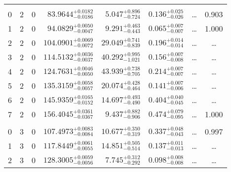 \begin{table*}[!]
\begin{tabular}{llcrrlrc}
\hline \\[-8pt]
0 & 2 & 0 & $     83.9644_{-      0.0186}^{+      0.0182}$ & $       5.047_{-       0.724}^{+       0.896}$ & $       0.136_{-       0.026}^{+       0.025}$ & \multicolumn{1}{c}{\dots} & 0.903\\[1pt]
1 & 2 & 0 & $     94.0829_{-      0.0047}^{+      0.0050}$ & $       9.291_{-       0.443}^{+       0.463}$ & $       0.065_{-       0.007}^{+       0.007}$ & \multicolumn{1}{c}{\dots} & 1.000\\[1pt]
2 & 2 & 0 & $    104.0901_{-      0.0072}^{+      0.0069}$ & $      29.049_{-       0.839}^{+       0.741}$ & $       0.196_{-       0.014}^{+       0.014}$ & \multicolumn{1}{c}{\dots} & \dots \\[1pt]
3 & 2 & 0 & $    114.5132_{-      0.0037}^{+      0.0036}$ & $      40.292_{-       1.021}^{+       0.995}$ & $       0.156_{-       0.008}^{+       0.007}$ & \multicolumn{1}{c}{\dots} & \dots \\[1pt]
4 & 2 & 0 & $    124.7631_{-      0.0050}^{+      0.0046}$ & $      43.939_{-       0.705}^{+       0.738}$ & $       0.214_{-       0.007}^{+       0.007}$ & \multicolumn{1}{c}{\dots} & \dots \\[1pt]
5 & 2 & 0 & $    135.3159_{-      0.0057}^{+      0.0058}$ & $      20.074_{-       0.464}^{+       0.428}$ & $       0.141_{-       0.006}^{+       0.007}$ & \multicolumn{1}{c}{\dots} & \dots \\[1pt]
6 & 2 & 0 & $    145.9359_{-      0.0152}^{+      0.0165}$ & $      14.697_{-       0.490}^{+       0.493}$ & $       0.404_{-       0.045}^{+       0.040}$ & \multicolumn{1}{c}{\dots} & \dots \\[1pt]
7 & 2 & 0 & $    156.4045_{-      0.0367}^{+      0.0361}$ & $       9.437_{-       0.906}^{+       0.882}$ & $       0.474_{-       0.095}^{+       0.079}$ & \multicolumn{1}{c}{\dots} & 1.000\\[1pt]

\hline \\[-8pt]
0 & 3 & 0 & $    107.4973_{-      0.0084}^{+      0.0083}$ & $      10.677_{-       0.319}^{+       0.350}$ & $       0.337_{-       0.043}^{+       0.048}$ & \multicolumn{1}{c}{\dots} & 0.997\\[1pt]
1 & 3 & 0 & $    117.8449_{-      0.0055}^{+      0.0061}$ & $      14.851_{-       0.514}^{+       0.505}$ & $       0.137_{-       0.013}^{+       0.011}$ & \multicolumn{1}{c}{\dots} & \dots \\[1pt]
2 & 3 & 0 & $    128.3005_{-      0.0056}^{+      0.0059}$ & $       7.745_{-       0.292}^{+       0.312}$ & $       0.098_{-       0.008}^{+       0.008}$ & \multicolumn{1}{c}{\dots} & \dots \\[1pt]
\hline
\end{tabular}
\end{table*}